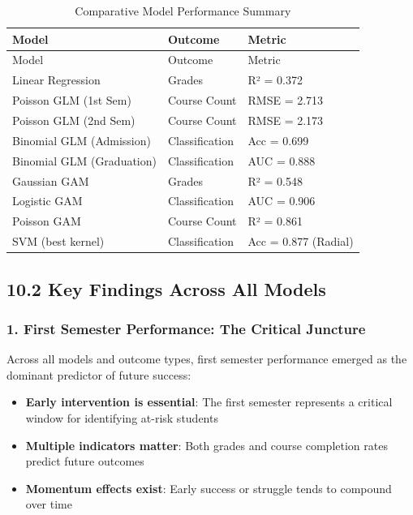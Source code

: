 \documentclass[
]{article}
\providecommand{\tightlist}{%
  \setlength{\itemsep}{0pt}\setlength{\parskip}{0pt}}
\begin{document}
\begin{longtable}[]{@{}lll@{}}
\caption{Comparative Model Performance Summary}\tabularnewline
\toprule\noalign{}
Model & Outcome & Metric \\
\midrule\noalign{}
\endfirsthead
\toprule\noalign{}
Model & Outcome & Metric \\
\midrule\noalign{}
\endhead
\bottomrule\noalign{}
\endlastfoot
Linear Regression & Grades & R² = 0.372 \\
Poisson GLM (1st Sem) & Course Count & RMSE = 2.713 \\
Poisson GLM (2nd Sem) & Course Count & RMSE = 2.173 \\
Binomial GLM (Admission) & Classification & Acc = 0.699 \\
Binomial GLM (Graduation) & Classification & AUC = 0.888 \\
Gaussian GAM & Grades & R² = 0.548 \\
Logistic GAM & Classification & AUC = 0.906 \\
Poisson GAM & Course Count & R² = 0.861 \\
SVM (best kernel) & Classification & Acc = 0.877 (Radial) \\
\end{longtable}

\subsection{10.2 Key Findings Across All
Models}\label{key-findings-across-all-models}

\subsubsection{1. First Semester Performance: The Critical
Juncture}\label{first-semester-performance-the-critical-juncture}

Across all models and outcome types, first semester performance emerged
as the dominant predictor of future success:

\begin{itemize}
\tightlist
\item
  \textbf{Early intervention is essential}: The first semester
  represents a critical window for identifying at-risk students
\item
  \textbf{Multiple indicators matter}: Both grades and course completion
  rates predict future outcomes
\item
  \textbf{Momentum effects exist}: Early success or struggle tends to
  compound over time
\end{itemize}
\end{document}
